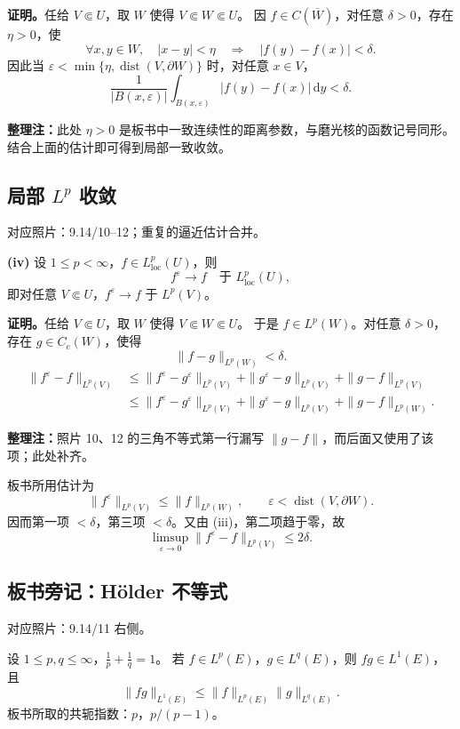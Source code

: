 \documentclass[UTF8,a4paper,11pt,fontset=fandol]{ctexart}
\newcommand{\dd}{\,\mathrm d}
\newcommand{\ednote}[1]{\par{\small\color{notegray}\textbf{整理注：}#1}\par}
\newcommand{\source}[1]{{\small\color{notegray}对应照片：#1。}\par}
\begin{document}
\textbf{证明。}任给 $V\Subset U$，取 $W$ 使得 $V\Subset W\Subset U$。
因 $f\in C(\overline W)$，对任意 $\delta>0$，存在 $\eta>0$，使
\[
\forall x,y\in W,\quad |x-y|<\eta\quad\Longrightarrow\quad|f(y)-f(x)|<\delta.
\]
因此当 $\varepsilon<\min\{\eta,\operatorname{dist}(V,\partial W)\}$ 时，对任意 $x\in V$，
\[
\frac1{|B(x,\varepsilon)|}\int_{B(x,\varepsilon)}|f(y)-f(x)|\dd y<\delta.
\]
\ednote{此处 $\eta>0$ 是板书中一致连续性的距离参数，与磨光核的函数记号同形。结合上面的估计即可得到局部一致收敛。}

\newpage
\subsection*{局部 $L^p$ 收敛}
\source{9.14/10--12；重复的逼近估计合并}
\textbf{(iv)} 设 $1\leq p<\infty$，$f\in L^p_{\mathrm{loc}}(U)$，则
\[
f^\varepsilon\longrightarrow f\quad\text{于 }L^p_{\mathrm{loc}}(U),
\]
即对任意 $V\Subset U$，$f^\varepsilon\to f$ 于 $L^p(V)$。

\textbf{证明。}任给 $V\Subset U$，取 $W$ 使得 $V\Subset W\Subset U$。
于是 $f\in L^p(W)$。对任意 $\delta>0$，存在 $g\in C_c(W)$，使得
\[
\|f-g\|_{L^p(W)}<\delta.
\]
\[
\begin{aligned}
\|f^\varepsilon-f\|_{L^p(V)}
&\leq\|f^\varepsilon-g^\varepsilon\|_{L^p(V)}
+\|g^\varepsilon-g\|_{L^p(V)}+\|g-f\|_{L^p(V)}\\
&\leq\|f^\varepsilon-g^\varepsilon\|_{L^p(V)}
+\|g^\varepsilon-g\|_{L^p(V)}+\|g-f\|_{L^p(W)}.
\end{aligned}
\]
\ednote{照片 10、12 的三角不等式第一行漏写 $\|g-f\|$，而后面又使用了该项；此处补齐。}
板书所用估计为
\[
\boxed{\|f^\varepsilon\|_{L^p(V)}\leq\|f\|_{L^p(W)},
\qquad\varepsilon<\operatorname{dist}(V,\partial W).}
\]
因而第一项 $<\delta$，第三项 $<\delta$。又由 (iii)，第二项趋于零，故
\[
\limsup_{\varepsilon\to0}\|f^\varepsilon-f\|_{L^p(V)}\leq2\delta.
\]

\subsection*{板书旁记：Hölder 不等式}
\source{9.14/11 右侧}
设 $1\leq p,q\leq\infty$，$\frac1p+\frac1q=1$。
若 $f\in L^p(E)$，$g\in L^q(E)$，则 $fg\in L^1(E)$，且
\[
\|fg\|_{L^1(E)}\leq\|f\|_{L^p(E)}\|g\|_{L^q(E)}.
\]
板书所取的共轭指数：$p$，$p/(p-1)$。

\newpage
\end{document}
